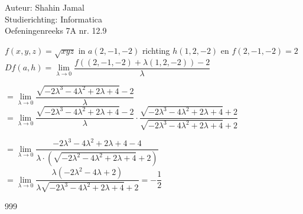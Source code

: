 \documentclass[a4paper]{article}
\begin{document}
  
\noindent \large Auteur: Shahin Jamal \\
\noindent \large Studierichting: Informatica\\
\noindent \large Oefeningenreeks 7A nr. 12.9\\

\medskip

\normalsize

$f(x,y,z) =\sqrt{xyz}$ in $a(2,-1,-2)$ richting $h(1,2,-2)$ en $f(2,-1,-2) = 2$\\

$Df(a,h) = \lim\limits_{\lambda \rightarrow 0} \dfrac{f\left((2,-1,-2) + \lambda(1,2,-2)\right) - 2}{\lambda}$

$= \lim\limits_{\lambda \rightarrow 0} \dfrac{\sqrt{-2\lambda^3 - 4\lambda^2 + 2\lambda + 4} - 2}{\lambda}$\\

$= \lim\limits_{\lambda \rightarrow 0} \dfrac{\sqrt{-2\lambda^3 - 4\lambda^2 + 2\lambda + 4} - 2}{\lambda} \cdot \dfrac{\sqrt{-2\lambda^3 - 4\lambda^2 + 2\lambda + 4} + 2}{\sqrt{-2\lambda^3 - 4\lambda^2 + 2\lambda + 4} + 2}$

$= \lim\limits_{\lambda \rightarrow 0} \dfrac{-2\lambda^3 - 4\lambda^2 + 2\lambda + 4 - 4}{\lambda\cdot\left(\sqrt{-2\lambda^2-4\lambda^2+2\lambda+4}+2\right)}$\\

$= \lim\limits_{\lambda \rightarrow 0} \dfrac{\lambda\left(-2\lambda^2-4\lambda+2\right)}{\lambda\sqrt{-2\lambda^3-4\lambda^2+2\lambda+4} + 2} = -\dfrac{1}{2}$

\begin{thebibliography}{999}
\end{thebibliography}
\end{document}
